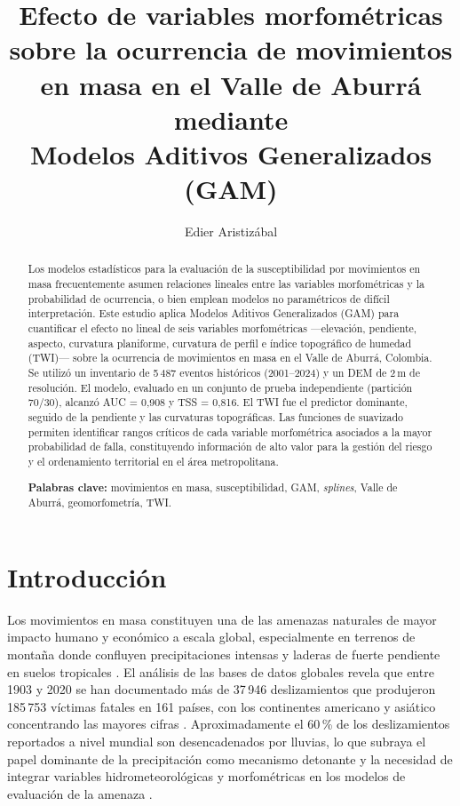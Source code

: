 \documentclass[12pt,a4paper]{article}
\title{\textbf{Efecto de variables morfométricas sobre la ocurrencia
de movimientos en masa en el Valle de Aburrá mediante\\
Modelos Aditivos Generalizados (GAM)}}
\author{Edier Aristizábal}
\begin{document}
\maketitle

\begin{abstract}
Los modelos estadísticos para la evaluación de la susceptibilidad por
movimientos en masa frecuentemente asumen relaciones lineales entre las
variables morfométricas y la probabilidad de ocurrencia, o bien
emplean modelos no paramétricos de difícil interpretación. Este
estudio aplica Modelos Aditivos Generalizados (GAM) para cuantificar
el efecto no lineal de seis variables morfométricas —elevación,
pendiente, aspecto, curvatura planiforme, curvatura de perfil e
índice topográfico de humedad (TWI)— sobre la ocurrencia de
movimientos en masa en el Valle de Aburrá, Colombia. Se utilizó un
inventario de 5\,487 eventos históricos (2001--2024) y un DEM de
2\,m de resolución. El modelo, evaluado en un conjunto de prueba
independiente (partición 70/30), alcanzó AUC = 0{,}908 y TSS =
0{,}816. El TWI fue el predictor dominante, seguido de la pendiente
y las curvaturas topográficas. Las funciones de suavizado permiten
identificar rangos críticos de cada variable morfométrica asociados
a la mayor probabilidad de falla, constituyendo información de alto
valor para la gestión del riesgo y el ordenamiento territorial en el
área metropolitana.

\bigskip\noindent\textbf{Palabras clave:} movimientos en masa,
susceptibilidad, GAM, \textit{splines}, Valle de Aburrá,
geomorfometría, TWI.
\end{abstract}

\section{Introducción}

Los movimientos en masa constituyen una de las amenazas naturales de
mayor impacto humano y económico a escala global, especialmente en
terrenos de montaña donde confluyen precipitaciones intensas
y laderas de fuerte pendiente en suelos tropicales \citep{aristizabal2026landslide,
gomez2023spatial, petley2012global}. El análisis de las bases de datos
globales revela que entre 1903 y 2020 se han
documentado más de 37\,946 deslizamientos que produjeron 185\,753
víctimas fatales en 161 países, con los continentes americano y asiático
concentrando las mayores cifras \citep{gomez2023spatial}.
Aproximadamente el 60\,\% de los deslizamientos reportados a nivel
mundial son desencadenados por lluvias, lo que subraya el papel
dominante de la precipitación como mecanismo detonante y la necesidad
de integrar variables hidrometeorológicas y morfométricas en los modelos
de evaluación de la amenaza \citep{gomez2023spatial,
aristizabal2026landslide}.
\end{document}
